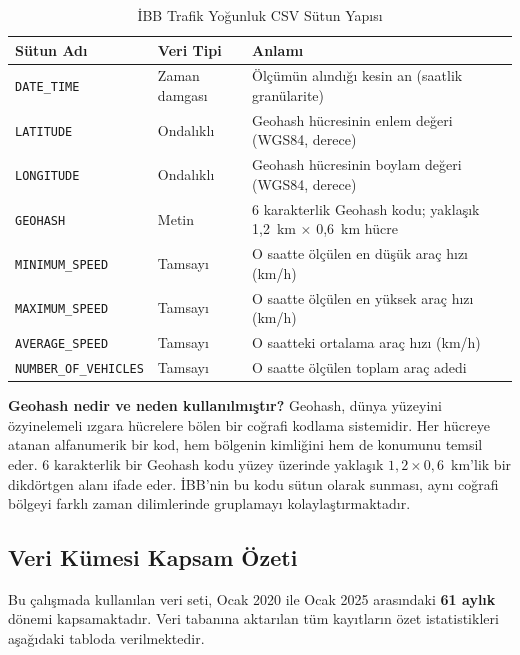 \documentclass[12pt,a4paper]{article}
\begin{document}
\begin{table}[H]
\centering
\caption{İBB Trafik Yoğunluk CSV Sütun Yapısı}
\label{tab:csv-schema}
\begin{tabularx}{\textwidth}{l l X}
\toprule
\textbf{Sütun Adı} & \textbf{Veri Tipi} & \textbf{Anlamı} \\
\midrule
\texttt{DATE\_TIME}            & Zaman damgası & Ölçümün alındığı kesin an (saatlik granülarite) \\
\texttt{LATITUDE}              & Ondalıklı     & Geohash hücresinin enlem değeri (WGS84, derece) \\
\texttt{LONGITUDE}             & Ondalıklı     & Geohash hücresinin boylam değeri (WGS84, derece) \\
\texttt{GEOHASH}               & Metin         & 6 karakterlik Geohash kodu; yaklaşık 1,2~km $\times$ 0,6~km hücre \\
\texttt{MINIMUM\_SPEED}        & Tamsayı       & O saatte ölçülen en düşük araç hızı (km/h) \\
\texttt{MAXIMUM\_SPEED}        & Tamsayı       & O saatte ölçülen en yüksek araç hızı (km/h) \\
\texttt{AVERAGE\_SPEED}        & Tamsayı       & O saatteki ortalama araç hızı (km/h) \\
\texttt{NUMBER\_OF\_VEHICLES}  & Tamsayı       & O saatte ölçülen toplam araç adedi \\
\bottomrule
\end{tabularx}
\end{table}

\textbf{Geohash nedir ve neden kullanılmıştır?} Geohash, dünya yüzeyini özyinelemeli ızgara hücrelere bölen bir coğrafi kodlama sistemidir. Her hücreye atanan alfanumerik bir kod, hem bölgenin kimliğini hem de konumunu temsil eder. 6 karakterlik bir Geohash kodu yüzey üzerinde yaklaşık $1{,}2 \times 0{,}6$~km'lik bir dikdörtgen alanı ifade eder. İBB'nin bu kodu sütun olarak sunması, aynı coğrafi bölgeyi farklı zaman dilimlerinde gruplamayı kolaylaştırmaktadır.

\subsection{Veri Kümesi Kapsam Özeti}

Bu çalışmada kullanılan veri seti, Ocak 2020 ile Ocak 2025 arasındaki \textbf{61 aylık} dönemi kapsamaktadır. Veri tabanına aktarılan tüm kayıtların özet istatistikleri aşağıdaki tabloda verilmektedir.
\end{document}
